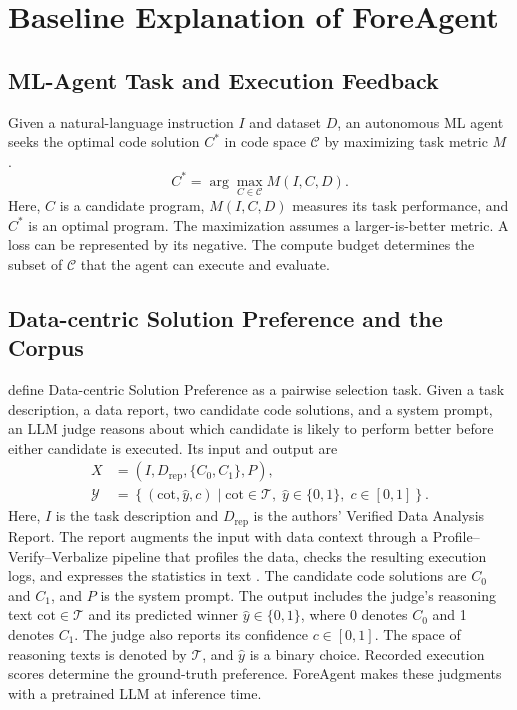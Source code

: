 \section{Baseline Explanation of ForeAgent}
\label{sec:baseline}

\subsection{ML-Agent Task and Execution Feedback}
Given a natural-language instruction $I$ and dataset $D$, an autonomous ML agent seeks the optimal code solution $C^*$ in code space $\mathcal C$ by maximizing task metric $M$ \citep[Section~2.1]{zheng2026predict}.
\begin{equation}
 C^*=\arg\max_{C\in\mathcal C} M(I,C,D).
 \label{eq:agent-objective}
\end{equation}
Here, $C$ is a candidate program, $M(I,C,D)$ measures its task performance, and $C^*$ is an optimal program. The maximization assumes a larger-is-better metric. A loss can be represented by its negative. The compute budget determines the subset of $\mathcal C$ that the agent can execute and evaluate.

\subsection{Data-centric Solution Preference and the Corpus}
\label{sec:preference}
\citet{zheng2026predict} define Data-centric Solution Preference as a pairwise selection task. Given a task description, a data report, two candidate code solutions, and a system prompt, an LLM judge reasons about which candidate is likely to perform better before either candidate is executed. Its input and output are
\begin{equation}
 \begin{aligned}
 X&=\left(I,D_{\mathrm{rep}},\{C_0,C_1\},P\right),\\
 \mathcal{Y}&=\left\{\left(\mathrm{cot},\hat y,c\right)\mid \mathrm{cot}\in\mathcal T,\;\hat y\in\{0,1\},\;c\in[0,1]\right\}.
 \end{aligned}
 \label{eq:predictor}
\end{equation}
Here, $I$ is the task description and $D_{\mathrm{rep}}$ is the authors' Verified Data Analysis Report. The report augments the input with data context through a Profile--Verify--Verbalize pipeline that profiles the data, checks the resulting execution logs, and expresses the statistics in text \citep[Section~3.4]{zheng2026predict}. The candidate code solutions are $C_0$ and $C_1$, and $P$ is the system prompt. The output includes the judge's reasoning text $\mathrm{cot}\in\mathcal T$ and its predicted winner $\hat y\in\{0,1\}$, where 0 denotes $C_0$ and 1 denotes $C_1$. The judge also reports its confidence $c\in[0,1]$. The space of reasoning texts is denoted by $\mathcal T$, and $\hat y$ is a binary choice. Recorded execution scores determine the ground-truth preference. ForeAgent makes these judgments with a pretrained LLM at inference time.

